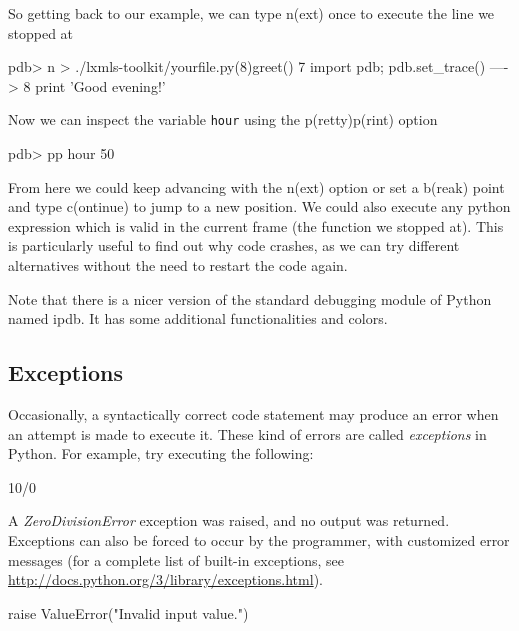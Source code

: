 
So getting back to our example, we can type n(ext) once to execute the line we
stopped at

\begin{python}
pdb> n
> ./lxmls-toolkit/yourfile.py(8)greet()
      7                 import pdb; pdb.set_trace()
----> 8                 print 'Good evening!' 
\end{python}

Now we can inspect the variable \texttt{hour} using the p(retty)p(rint) option

\begin{python}
pdb> pp hour
50
\end{python}

From here we could keep advancing with the n(ext) option or set a b(reak) point
and type c(ontinue) to jump to a new position. We could also execute any python
expression which is valid in the current frame (the function we stopped at).
This is particularly useful to find out why code crashes, as we can try
different alternatives without the need to restart the code again.

Note that there is a nicer version of the standard debugging module of Python
named ipdb. It has some additional functionalities and colors. 

\subsection{Exceptions}

Occasionally, a syntactically correct code statement may produce an error when
an attempt is made to execute it. These kind of errors are called
\textit{exceptions} in Python. For example, try executing the following:

\begin{python}
10/0
\end{python}

A \textit{ZeroDivisionError} exception was raised, and no output was returned.
Exceptions can also be forced to occur by the programmer, with customized error
messages (for a complete list of built-in exceptions, see
\url{http://docs.python.org/3/library/exceptions.html}).

\begin{python}
raise ValueError("Invalid input value.")
\end{python}

